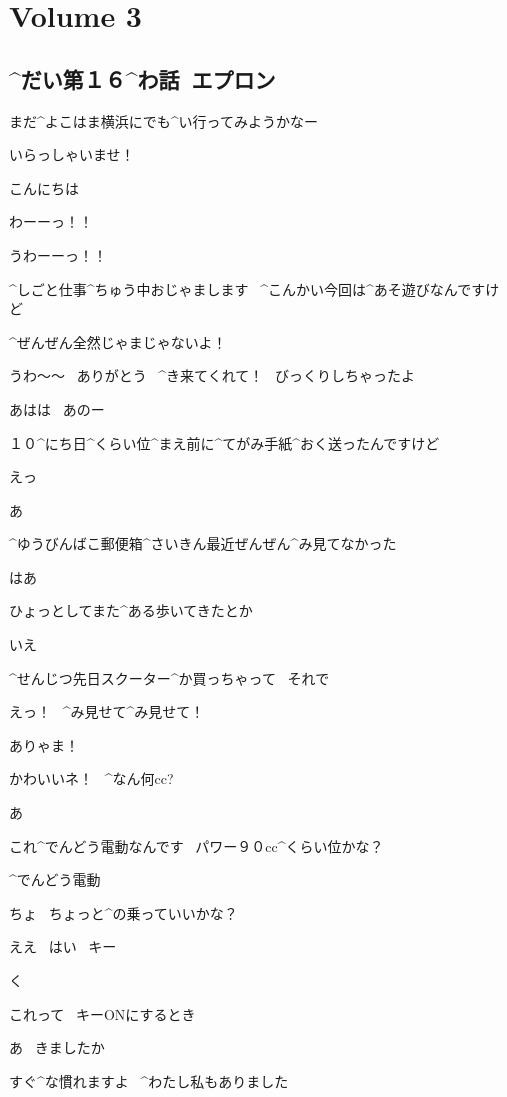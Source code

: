 \section{Volume 3}

\subsection{^{だい}{第}１６^{わ}{話}\ エプロン}

\page[5]
\A まだ^{よこはま}{横浜}にでも^{い}{行}ってみようかなー

\A いらっしゃいませ！

\page
\K こんにちは

\A わーーっ！！

\A うわーーっ！！

\page
\K ^{しごと}{仕事}^{ちゅう}{中}おじゃまします
\ ^{こんかい}{今回}は^{あそ}{遊}びなんですけど

\A ^{ぜんぜん}{全然}じゃまじゃないよ！

\A うわ〜〜
\ ありがとう
\ ^{き}{来}てくれて！
\ びっくりしちゃったよ

\K あはは
\ あのー

\K １０^{にち}{日}^{くらい}{位}^{まえ}{前}に^{てがみ}{手紙}^{おく}{送}ったんですけど

\A えっ

\A あ

\A ^{ゆうびんばこ}{郵便箱}^{さいきん}{最近}ぜんぜん^{み}{見}てなかった

\K はあ

\page
\A ひょっとしてまた^{ある}{歩}いてきたとか

\K いえ

\K ^{せんじつ}{先日}スクーター^{か}{買}っちゃって
\ それで

\A えっ！
\ ^{み}{見}せて^{み}{見}せて！

\page
\A ありゃま！

\A かわいいネ！
\ ^{なん}{何}cc?

\K あ

\K これ^{でんどう}{電動}なんです
\ パワー９０cc^{くらい}{位}かな？

\A ^{でんどう}{電動}

\A ちょ
\ ちょっと^{の}{乗}っていいかな？

\K ええ
\ はい
\ キー

\page
\A く

\A これって
\ キーONにするとき

\K あ
\ きましたか

\K すぐ^{な}{慣}れますよ
\ ^{わたし}{私}もありました


